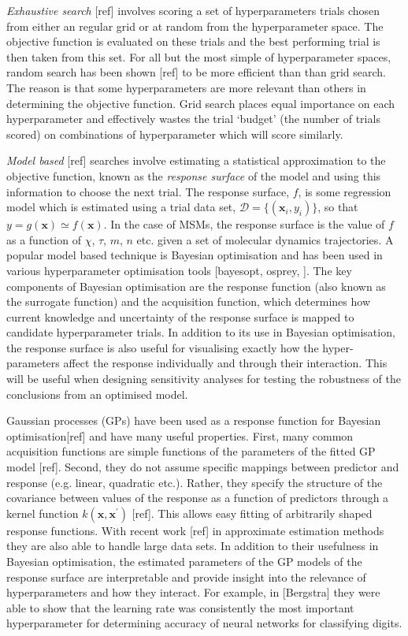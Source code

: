 \emph{Exhaustive search} [ref] involves scoring a set of  hyperparameters trials chosen from either an regular grid or at random from the hyperparameter space. The objective function is evaluated on these trials and the best performing trial is then taken from this set. For all but the most simple of hyperparameter spaces, random search has been shown [ref] to be more efficient than  than grid search. The reason is that some hyperparameters are more relevant than others in determining the objective function. Grid search places equal importance on each hyperparameter and effectively wastes the trial `budget' (the number of trials scored) on combinations of hyperparameter which will score similarly. 

\emph{Model based} [ref] searches involve estimating a statistical approximation to the objective function, known  as the \emph{response surface} of the model and using this information to choose the next trial\cite{jonesEfficientGlobalOptimization1998}. The response surface, $f$, is some regression model which is estimated using a trial data set,  $\mathcal{D}=\{(\mathbf{x}_{i}, y_{i})\}$, so that $y=g(\mathbf{x}) \simeq f(\mathbf{x})$.  In the case of MSMs, the response surface is the value of $f$ as a function of $\chi$, $\tau$, $m$, $n$ etc. given a set of molecular dynamics trajectories. A popular model based technique is Bayesian optimisation and has been used in various hyperparameter optimisation tools [bayesopt, osprey, ].  The key components of Bayesian optimisation are the response function (also known as the surrogate function) and the acquisition function, which determines how current knowledge and uncertainty of the response surface is mapped to candidate hyperparameter trials. In addition to its use in Bayesian optimisation, the response surface is also useful for visualising exactly how the hyper-parameters affect the response individually and through their interaction. This will be useful when designing sensitivity analyses for testing the robustness of the conclusions from an optimised model. 

Gaussian processes (GPs) have been used as a response function for Bayesian optimisation[ref] and have many useful properties. First, many common acquisition functions are simple functions of the parameters of the fitted GP model [ref]. Second, they do not assume specific mappings between predictor and response (e.g. linear, quadratic etc.). Rather, they specify the structure of the covariance between values of the response as a function of predictors through a kernel function $k(\mathbf{x}, \mathbf{x}^{\prime})$ [ref]. This allows easy fitting of arbitrarily shaped response functions.  With recent work [ref] in approximate estimation methods they are also able to handle large data sets. In addition to their usefulness in Bayesian optimisation, the estimated parameters of the GP models of the response surface are interpretable and provide insight into the relevance of hyperparameters and how they interact.  For example, in [Bergstra] they were able to show that the learning rate was consistently the most important hyperparameter for determining accuracy of neural networks for classifying digits. 

